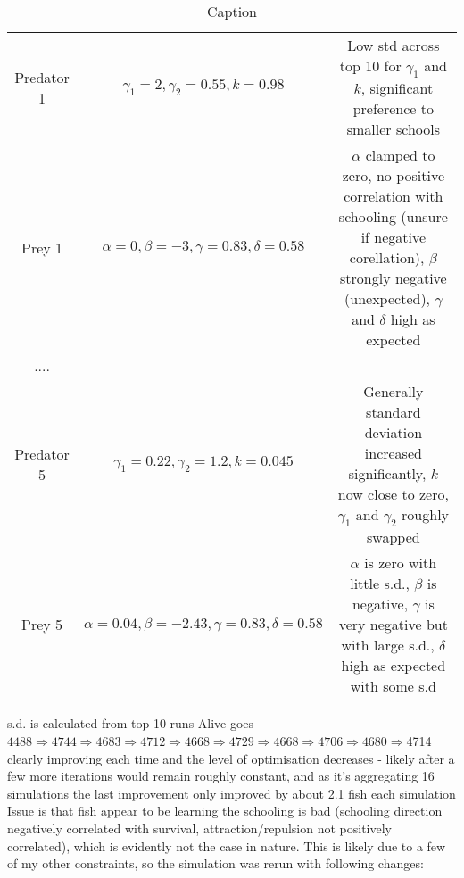 \begin{table}
    \centering
    \begin{tabular}{ccc}
         Predator 1&  $\gamma_1=2, \gamma_2=0.55, k=0.98$& Low std across top 10 for $\gamma_1$ and $k$, significant preference to smaller schools\\
         Prey 1&  $\alpha=0,\beta=-3, \gamma=0.83,\delta=0.58$& $\alpha$ clamped to zero, no positive correlation with schooling (unsure if negative corellation), $\beta$ strongly negative (unexpected), $\gamma$ and $\delta$ high as expected\\
         ....&  & \\
         Predator 5&  $\gamma_1=0.22, \gamma_2=1.2, k=0.045$& Generally standard deviation increased significantly, $k$ now close to zero, $\gamma_1$ and $\gamma_2$ roughly swapped\\
         Prey 5&  $\alpha=0.04,\beta=-2.43, \gamma=0.83,\delta=0.58$& $\alpha$ is zero with little s.d., $\beta$ is negative, $\gamma$ is very negative but with large s.d., $\delta$ high as expected with some s.d\\
    \end{tabular}
    \caption{Caption}
    \label{tab:placeholder}
\end{table}
s.d. is calculated from top 10 runs
Alive goes $4488\Longrightarrow4744\Longrightarrow4683\Longrightarrow4712\Longrightarrow4668\Longrightarrow4729\Longrightarrow4668\Longrightarrow4706\Longrightarrow4680\Longrightarrow$4714
clearly improving each time and the level of optimisation decreases - likely after a few more iterations would remain roughly constant, and as it's aggregating 16 simulations the last improvement only improved by about 2.1 fish each simulation
Issue is that fish appear to be learning the schooling is bad (schooling direction negatively correlated with survival, attraction/repulsion not positively correlated), which is evidently not the case in nature. This is likely due to a few of my other constraints, so the simulation was rerun with following changes:
